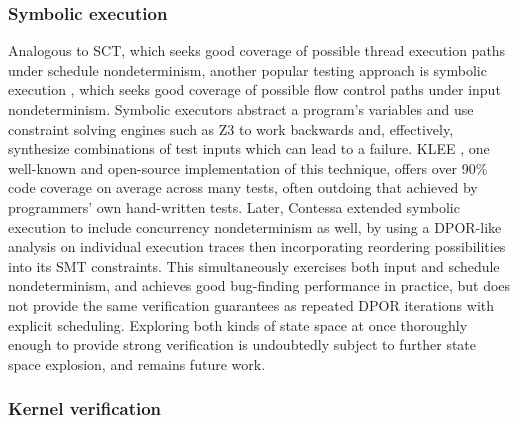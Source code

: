 \subsubsection{Symbolic execution}

Analogous to SCT,
which seeks good coverage of possible thread execution paths under schedule nondeterminism,
another popular testing approach is symbolic execution \cite{symbolic-execution},
which seeks good coverage of possible flow control paths under input nondeterminism.
Symbolic executors
abstract a program's variables and use constraint solving engines such as Z3 \cite{z3}
to work backwards and, effectively,
synthesize combinations of test inputs which can lead to a failure.
KLEE \cite{klee}, one well-known and open-source implementation of this technique,
offers over 90\% code coverage on average across many tests,
often outdoing that achieved by programmers' own hand-written tests.
Later, Contessa \cite{contessa} extended symbolic execution to include concurrency nondeterminism as well,
by using a DPOR-like analysis on individual execution traces
then incorporating reordering possibilities into its SMT constraints.
This simultaneously exercises both input and schedule nondeterminism,
and achieves good bug-finding performance in practice,
but does not provide the same verification guarantees as repeated DPOR iterations with explicit scheduling.
Exploring both kinds of state space at once thoroughly enough to provide strong verification
is undoubtedly subject to further state space explosion,
and remains future work.

\subsubsection{Kernel verification}

